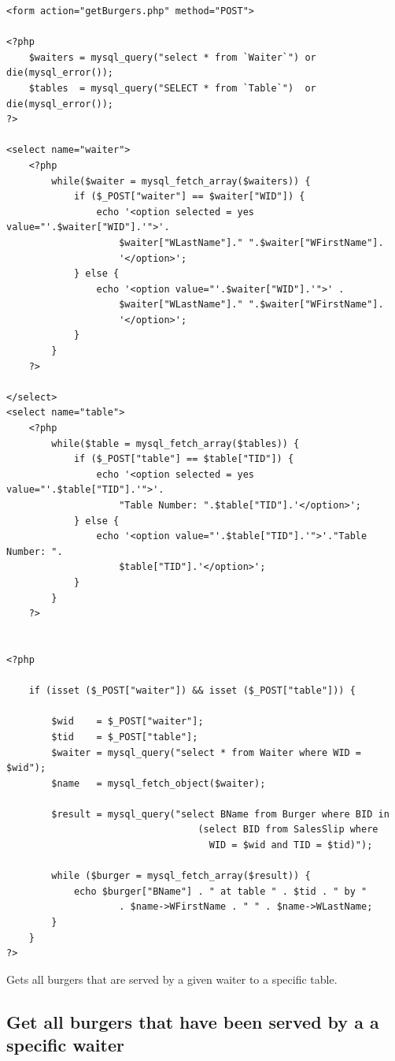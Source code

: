 \documentclass[10pt, a4paper]{article}
\begin{document}
\begin{lstlisting}[caption=getBurgers.php]
<form action="getBurgers.php" method="POST">

<?php
    $waiters = mysql_query("select * from `Waiter`") or die(mysql_error());
    $tables  = mysql_query("SELECT * from `Table`")  or die(mysql_error());
?>

<select name="waiter">
    <?php
        while($waiter = mysql_fetch_array($waiters)) {
            if ($_POST["waiter"] == $waiter["WID"]) {
                echo '<option selected = yes value="'.$waiter["WID"].'">'.
                    $waiter["WLastName"]." ".$waiter["WFirstName"].
                    '</option>';
            } else {
                echo '<option value="'.$waiter["WID"].'">' .
                    $waiter["WLastName"]." ".$waiter["WFirstName"].
                    '</option>';
            }
        }
    ?>
    
</select>
<select name="table">
    <?php
        while($table = mysql_fetch_array($tables)) {
            if ($_POST["table"] == $table["TID"]) {
                echo '<option selected = yes value="'.$table["TID"].'">'.
                	"Table Number: ".$table["TID"].'</option>';
            } else {
                echo '<option value="'.$table["TID"].'">'."Table Number: ".
                	$table["TID"].'</option>'; 
            }
        }
    ?>


<?php
    
    if (isset ($_POST["waiter"]) && isset ($_POST["table"])) {
        
        $wid    = $_POST["waiter"];
        $tid    = $_POST["table"];
        $waiter = mysql_query("select * from Waiter where WID = $wid");
        $name   = mysql_fetch_object($waiter); 
        
        $result = mysql_query("select BName from Burger where BID in 
                                  (select BID from SalesSlip where 
                                  	WID = $wid and TID = $tid)");
        
        while ($burger = mysql_fetch_array($result)) {
            echo $burger["BName"] . " at table " . $tid . " by " 
                    . $name->WFirstName . " " . $name->WLastName;
        } 
    }
?>
\end{lstlisting}
Gets all burgers that are served by a given waiter to a specific table.

\subsection{Get all burgers that have been served by a a specific waiter}
\end{document}

